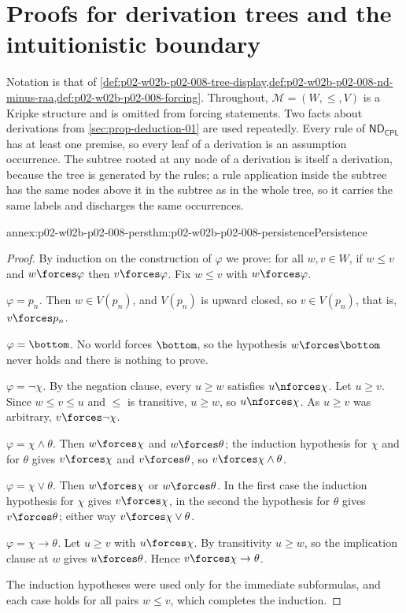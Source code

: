 \section{Proofs for derivation trees and the intuitionistic boundary}
\label{sec:annex-p02-w02b-p02-008-trees-and-boundary}

Notation is that of
\cref{def:p02-w02b-p02-008-tree-display,def:p02-w02b-p02-008-nd-minus-raa,def:p02-w02b-p02-008-forcing}.
Throughout, \(\mathcal M=(W,\leq,V)\) is a Kripke structure and is omitted
from forcing statements.  Two facts about derivations from
\cref{sec:prop-deduction-01} are used repeatedly.  Every rule of
\(\mathsf{ND}_{\mathsf{CPL}}\) has at least one premise, so every leaf of a
derivation is an assumption occurrence.  The subtree rooted at any node of a
derivation is itself a derivation, because the tree is generated by the
rules; a rule application inside the subtree has the same nodes above it in
the subtree as in the whole tree, so it carries the same labels and
discharges the same occurrences.

\begin{annexitem}{annex:p02-w02b-p02-008-pers}{thm:p02-w02b-p02-008-persistence}{Persistence}
\begin{proof}
By induction on the construction of \(\varphi\) we prove: for all
\(w,v\in W\), if \(w\leq v\) and \(w\forces\varphi\) then
\(v\forces\varphi\).  Fix \(w\leq v\) with \(w\forces\varphi\).

\emph{\(\varphi=p_n\).}  Then \(w\in V(p_n)\), and \(V(p_n)\) is upward
closed, so \(v\in V(p_n)\), that is, \(v\forces p_n\).

\emph{\(\varphi=\bottom\).}  No world forces \(\bottom\), so the hypothesis
\(w\forces\bottom\) never holds and there is nothing to prove.

\emph{\(\varphi=\neg\chi\).}  By the negation clause, every \(u\geq w\)
satisfies \(u\nforces\chi\).  Let \(u\geq v\).  Since \(w\leq v\leq u\) and
\(\leq\) is transitive, \(u\geq w\), so \(u\nforces\chi\).  As \(u\geq v\) was
arbitrary, \(v\forces\neg\chi\).

\emph{\(\varphi=\chi\land\theta\).}  Then \(w\forces\chi\) and
\(w\forces\theta\); the induction hypothesis for \(\chi\) and for \(\theta\)
gives \(v\forces\chi\) and \(v\forces\theta\), so \(v\forces\chi\land\theta\).

\emph{\(\varphi=\chi\lor\theta\).}  Then \(w\forces\chi\) or
\(w\forces\theta\).  In the first case the induction hypothesis for \(\chi\)
gives \(v\forces\chi\), in the second the hypothesis for \(\theta\) gives
\(v\forces\theta\); either way \(v\forces\chi\lor\theta\).

\emph{\(\varphi=\chi\to\theta\).}  Let \(u\geq v\) with \(u\forces\chi\).  By
transitivity \(u\geq w\), so the implication clause at \(w\) gives
\(u\forces\theta\).  Hence \(v\forces\chi\to\theta\).

The induction hypotheses were used only for the immediate subformulas, and
each case holds for all pairs \(w\leq v\), which completes the induction.
\end{proof}
\end{annexitem}

